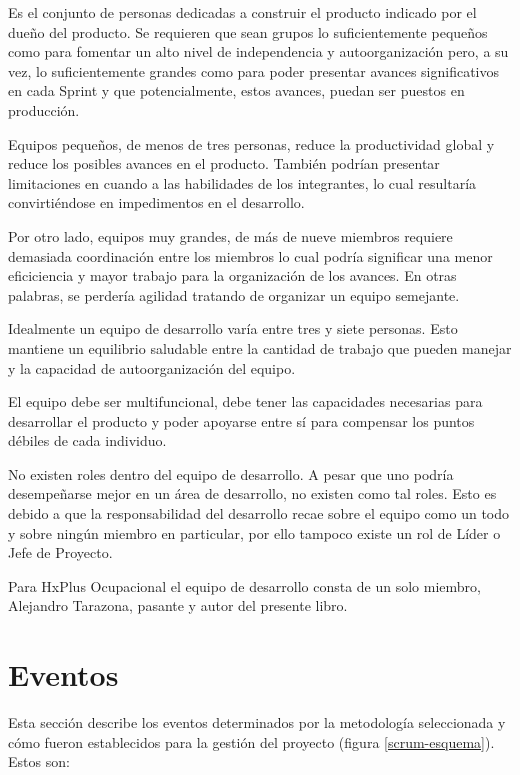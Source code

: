         Es el conjunto de personas dedicadas a construir el producto indicado por el dueño del producto. Se requieren que sean grupos lo suficientemente pequeños como para fomentar un alto nivel de independencia y autoorganización pero, a su vez, lo suficientemente grandes como para poder presentar avances significativos en cada Sprint y que potencialmente, estos avances, puedan ser puestos en producción.
        
        Equipos pequeños, de menos de tres personas, reduce la productividad global y reduce los posibles avances en el producto. También podrían presentar limitaciones en cuando a las habilidades de los integrantes, lo cual resultaría convirtiéndose en impedimentos en el desarrollo.
        
        Por otro lado, equipos muy grandes, de más de nueve miembros requiere demasiada coordinación entre los miembros lo cual podría significar una menor eficiciencia y mayor trabajo para la organización de los avances. En otras palabras, se perdería agilidad tratando de organizar un equipo semejante.
        
        Idealmente un equipo de desarrollo varía entre tres y siete personas. Esto mantiene un equilibrio saludable entre la cantidad de trabajo que pueden manejar y la capacidad de autoorganización del equipo.
        
        El equipo debe ser multifuncional, debe tener las capacidades necesarias para desarrollar el producto y poder apoyarse entre sí para compensar los puntos débiles de cada individuo.
        
        No existen roles dentro del equipo de desarrollo. A pesar que uno podría desempeñarse mejor en un área de desarrollo, no existen como tal roles. Esto es debido a que la responsabilidad del desarrollo recae sobre el equipo como un todo y sobre ningún miembro en particular, por ello tampoco existe un rol de Líder o Jefe de Proyecto.
        
        Para HxPlus Ocupacional el equipo de desarrollo consta de un solo miembro, Alejandro Tarazona, pasante y autor del presente libro.
        
    \section{Eventos}
    
    Esta sección describe los eventos determinados por la metodología seleccionada y cómo fueron establecidos para la gestión del proyecto (figura \ref{scrum-esquema}). Estos son:
    
